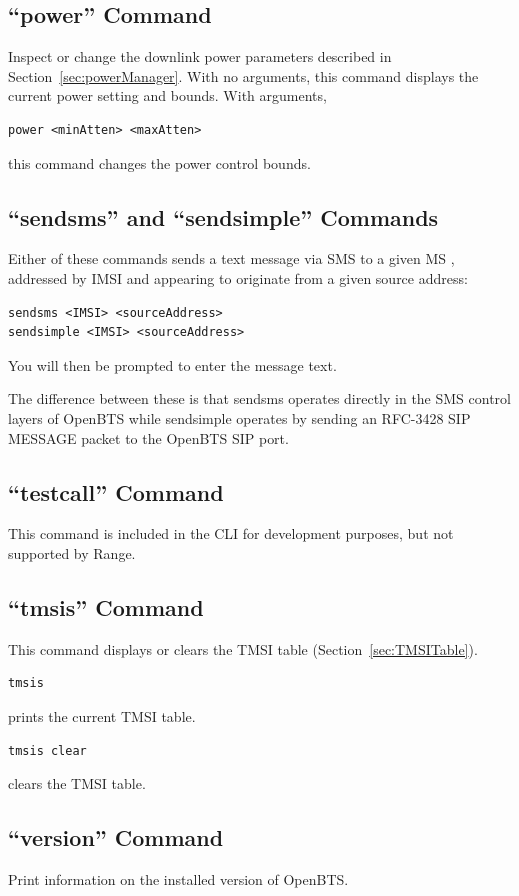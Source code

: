 \documentclass[11pt,openany]{book}
\begin{document}
\subsection{``power'' Command}
\label{sec:powerCmd}
Inspect or change the downlink power parameters described in Section~\ref{sec:powerManager}.
With no arguments, this command displays the current power setting and bounds.
With arguments,
\begin{verbatim}
power <minAtten> <maxAtten>
\end{verbatim}
this command changes the power control bounds.



\subsection{``sendsms'' and ``sendsimple'' Commands}
\label{sec:sendsmsCmd}
Either of these commands sends a text message via SMS to a given MS , addressed by IMSI and appearing to originate from a given source address:
\begin{verbatim}
sendsms <IMSI> <sourceAddress>
sendsimple <IMSI> <sourceAddress>
\end{verbatim}
You will then be prompted to enter the message text.

The difference between these is that sendsms operates directly in the SMS control layers of OpenBTS while sendsimple operates by sending an RFC-3428 SIP MESSAGE packet to the OpenBTS SIP port.

\subsection{``testcall'' Command}
\label{sec:testcallCmd}
This command is included in the CLI for development purposes, but not supported by Range.

\subsection{``tmsis'' Command}
\label{sec:tmsisCmd}
This command displays or clears the TMSI table (Section~\ref{sec:TMSITable}).
\begin{verbatim}
tmsis
\end{verbatim}
prints the current TMSI table.
\begin{verbatim}
tmsis clear
\end{verbatim}
clears the TMSI table.


\subsection{``version'' Command}
Print information on the installed version of OpenBTS.
\end{document}
